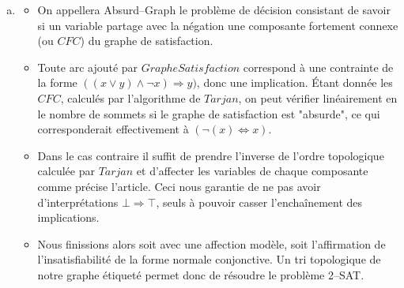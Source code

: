 \begin{enumerate}[(a)]
\item 
\begin{itemize}
\item On appellera Absurd--Graph le problème de décision consistant de savoir si un variable partage avec la négation une composante fortement connexe (ou $CFC$) du graphe de satisfaction. 
\item Toute arc ajouté par $GrapheSatisfaction$ correspond à une contrainte de la forme $((x \vee y) \wedge \neg x) \Rightarrow y)$, donc une implication. Étant donnée les $CFC$, calculés par l'algorithme de $Tarjan$, on peut vérifier linéairement en le nombre de sommets si le graphe de satisfaction est "absurde", ce qui corresponderait effectivement à $(\neg(x) \Leftrightarrow x)$.
\item Dans le cas contraire il suffit de prendre l'inverse de l'ordre topologique calculée par $Tarjan$ et d'affecter les variables de chaque composante comme précise l'article. Ceci nous garantie de ne pas avoir d'interprétations $\bot \Rightarrow \top$, seuls à pouvoir casser l'enchaînement des implications. 
\item Nous finissions alors soit avec une affection modèle, soit l'affirmation de l'insatisfiabilité de la forme normale conjonctive. Un tri topologique de notre graphe étiqueté permet donc de résoudre le problème 2--SAT.
\end{itemize}
\end{enumerate}



